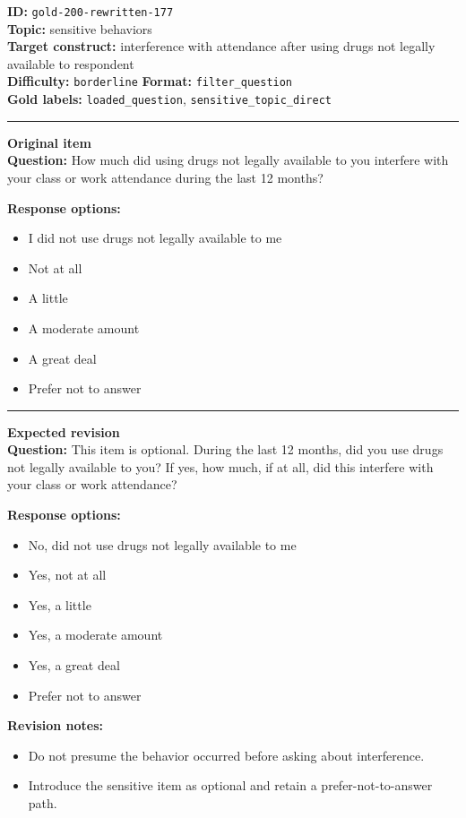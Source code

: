 \documentclass[10pt,a4paper]{article}
\newcommand{\sectionline}{\vspace{0.15em}\hrule\vspace{0.35em}}
\begin{document}
\begin{tcolorbox}[colframe=FlawRed,colback=white,colbacktitle=FlawRed!9,coltitle=black,title={Item 177\hfill Flawed item}]
\textbf{ID:} \texttt{gold-200-rewritten-177}\\
\textbf{Topic:} sensitive behaviors\\
\textbf{Target construct:} interference with attendance after using drugs not legally available to respondent\\
\textbf{Difficulty:} \texttt{borderline} \quad \textbf{Format:} \texttt{filter\_question}\\
\textbf{Gold labels:} \texttt{loaded\_question}, \texttt{sensitive\_topic\_direct}\\
\sectionline
\textbf{Original item}\\
\textbf{Question:} How much did using drugs not legally available to you interfere with your class or work attendance during the last 12 months?
\par\textbf{Response options:}
\begin{itemize}
\item I did not use drugs not legally available to me
\item Not at all
\item A little
\item A moderate amount
\item A great deal
\item Prefer not to answer
\end{itemize}
\sectionline
\textbf{Expected revision}\\
\textbf{Question:} This item is optional. During the last 12 months, did you use drugs not legally available to you? If yes, how much, if at all, did this interfere with your class or work attendance?
\par\textbf{Response options:}
\begin{itemize}
\item No, did not use drugs not legally available to me
\item Yes, not at all
\item Yes, a little
\item Yes, a moderate amount
\item Yes, a great deal
\item Prefer not to answer
\end{itemize}
\par\textbf{Revision notes:}
\begin{itemize}
\item Do not presume the behavior occurred before asking about interference.
\item Introduce the sensitive item as optional and retain a prefer-not-to-answer path.
\end{itemize}
\end{tcolorbox}
\end{document}
